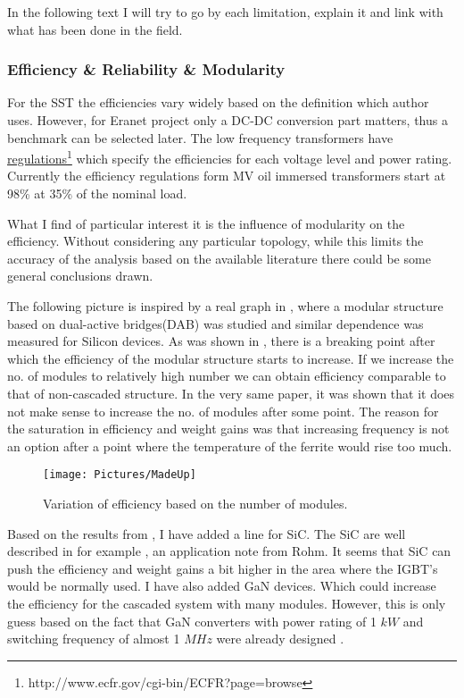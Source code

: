 \documentclass[]{scrartcl}
\begin{document}
In the following text I will try to go by each limitation, explain it and link with what has been done in the field.


\subsubsection{Efficiency \& Reliability \& Modularity}

For the SST the efficiencies vary widely based on the definition which author uses. However, for Eranet project only a DC-DC conversion part matters, thus a benchmark can be selected later. The low frequency transformers have \href{<http://www.ecfr.gov/cgi-bin/ECFR?page=browse>}{regulations}\footnote{http://www.ecfr.gov/cgi-bin/ECFR?page=browse} which specify the efficiencies for each voltage level and power rating. Currently the efficiency regulations form MV oil immersed transformers start at 98\% at 35\% of the nominal load. 

What I find of particular interest it is the influence of modularity on the efficiency. Without considering any particular topology, while this limits the accuracy of the analysis based on the available literature there could be some general conclusions drawn. 

The following picture is inspired by a real graph in \cite{Yang2014}, where a modular structure based on dual-active bridges(DAB) was studied and similar dependence was measured for Silicon devices. As was shown in \cite{Yang2014}, there is a breaking point after which the efficiency of the modular structure starts to increase. If we  increase the no. of modules to relatively high number we can obtain efficiency comparable to that of non-cascaded structure. In the very same paper, it was shown that it does not make sense to increase the no. of modules after some point. The reason for the saturation in efficiency and weight gains was that increasing frequency is not an option after a point where the temperature of the ferrite would rise too much. 



\begin{figure}[h!]
	\centering
	\texttt{[image: Pictures/MadeUp]}
	\caption{Variation of efficiency based on the number of modules.}
	\label{fig:MadeUp}
\end{figure}

Based on the results from \cite{Yang2014}, I have added a line for SiC.  The SiC are well described in for example \cite{Rohm2014}, an application note from Rohm. It seems that SiC can push the efficiency and weight gains a bit higher in the area where the IGBT's would be normally used. I have also added GaN devices. Which could increase the efficiency for the cascaded system with many modules. However, this is only guess based on the fact that GaN converters with power rating of 1 $kW$ and switching frequency of almost 1 $MHz$ were already designed \cite{Mu2014}. 
\end{document}
